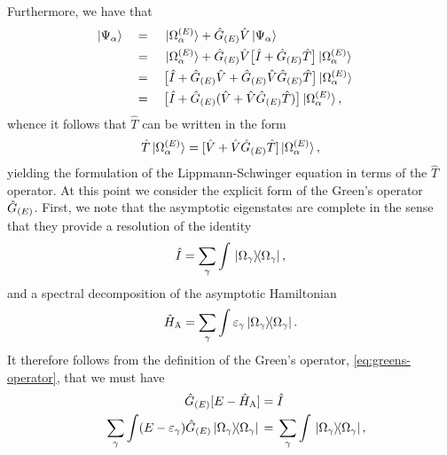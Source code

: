 \documentclass[draft]{article}
\begin{document}
Furthermore, we have that
\begin{alignat*}{4}
  &
  \ket{\Psi_{\alpha}}
  &&
  {}={}
  &&
  \ket*{\Omega_{\alpha}^{\lr{E}}}
  +
  \hat{G}_{\lr{E}}
  \hat{V}
  \ket{\Psi_{\alpha}}
  &
  \\
  &
  &&
  {}={}
  &&
  \ket*{\Omega_{\alpha}^{\lr{E}}}
  +
  \hat{G}_{\lr{E}}
  \hat{V}
  \lrsq[\big]
  {
    \hat{I}
    +
    \hat{G}_{\lr{E}}
    \hat{T}
  }
  \ket*{\Omega_{\alpha}^{\lr{E}}}
  &
  \\
  &
  &&
  {}={}
  &&
  \lrsq[\big]
  {
    \hat{I}
    +
    \hat{G}_{\lr{E}}
    \hat{V}
    +
    \hat{G}_{\lr{E}}
    \hat{V}
    \hat{G}_{\lr{E}}
    \hat{T}
  }
  \ket*{\Omega_{\alpha}^{\lr{E}}}
  &
  \\
  &
  &&
  {}={}
  &&
  \lrsq[\big]
  {
    \hat{I}
    +
    \hat{G}_{\lr{E}}
    \lr
    {
      \hat{V}
      +
      \hat{V}
      \hat{G}_{\lr{E}}
      \hat{T}
    }
  }
  \ket*{\Omega_{\alpha}^{\lr{E}}}
  ,
  &
\end{alignat*}
whence it follows that $\hat{T}$ can be written in the form
\begin{equation}
  \label{eq:ls-t-greens}
  \hat{T}
  \ket*{\Omega_{\alpha}^{\lr{E}}}
  =
  \lrsq
  {
    \hat{V}
    +
    \hat{V}
    \hat{G}_{\lr{E}}
    \hat{T}
  }
  \ket*{\Omega_{\alpha}^{\lr{E}}}
  ,
\end{equation}
yielding the formulation of the Lippmann-Schwinger equation in terms of the
$\hat{T}$ operator.
At this point we consider the explicit form of the Green's operator
$\hat{G}_{\lr{E}}$.
First, we note that the asymptotic eigenstates are complete in the sense that
they provide a resolution of the identity
\begin{equation}
  \label{eq:asymptotic-complete}
  \hat{I}
  =
  \sum_{\gamma}\int
  \ketbra*{\Omega_{\gamma}}{\Omega_{\gamma}}
  ,
\end{equation}
and a spectral decomposition of the asymptotic Hamiltonian
\begin{equation*}
  \hat{H}_{\rm{A}}
  =
  \sum_{\gamma}\int
  \varepsilon_{\gamma}
  \ketbra*{\Omega_{\gamma}}{\Omega_{\gamma}}
  .
\end{equation*}
It therefore follows from the definition of the Green's operator,
\autoref{eq:greens-operator}, that we must have
\begin{alignat*}{2}
  &
  &
  \hat{G}_{\lr{E}}
  \lrsq
  {
    E
    -
    \hat{H}_{\rm{A}}
  }
  {}={}
  &
  \hat{I}
  \\
  &
  &
  \sum_{\gamma}\int
  \lr
  {
    E
    -
    \varepsilon_{\gamma}
  }
  \hat{G}_{\lr{E}}
  \ketbra*{\Omega_{\gamma}}{\Omega_{\gamma}}
  {}={}
  &
  \sum_{\gamma}\int
  \ketbra*{\Omega_{\gamma}}{\Omega_{\gamma}}
  ,
\end{alignat*}
\end{document}
